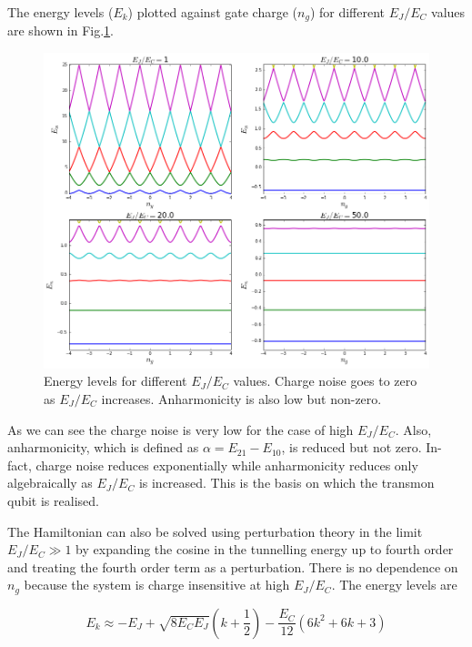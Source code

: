 The energy levels ($E_k$) plotted against gate charge ($n_g$) for different $E_J/E_C$ values are shown in Fig.\ref{fig:diff EJ/EC}.

\begin{figure}
\centering
\includegraphics[width=\linewidth]{Figures/EjEcall.png}
\decoRule
\caption[Different $E_J/E_C$]{Energy levels for different $E_J/E_C$ values. Charge noise goes to zero as $E_J/E_C$ increases. Anharmonicity is also low but non-zero.}
\label{fig:diff EJ/EC}
\end{figure}

As we can see the charge noise is very low for the case of high $E_J/E_C$. Also, anharmonicity, which is defined as $\alpha=E_{21}-E_{10}$, is reduced but not zero. In-fact, charge noise reduces exponentially while anharmonicity reduces only algebraically as $E_J/E_C$ is increased. This is the basis on which the transmon qubit is realised.

The Hamiltonian can also be solved using perturbation theory in the limit $E_J/E_C\gg 1$ by expanding the cosine in the tunnelling energy up to fourth order and treating the fourth order term as a perturbation. There is no dependence on $n_g$ because the system is charge insensitive at high $E_J/E_C$. The energy levels are \cite{Koch2007a}

\begin{equation}
E_k\approx-E_J+\sqrt{8E_CE_J}\left(k+\frac{1}{2}\right)-\frac{E_C}{12}(6k^2+6k+3)
\label{eqn:transmon levels}
\end{equation}

